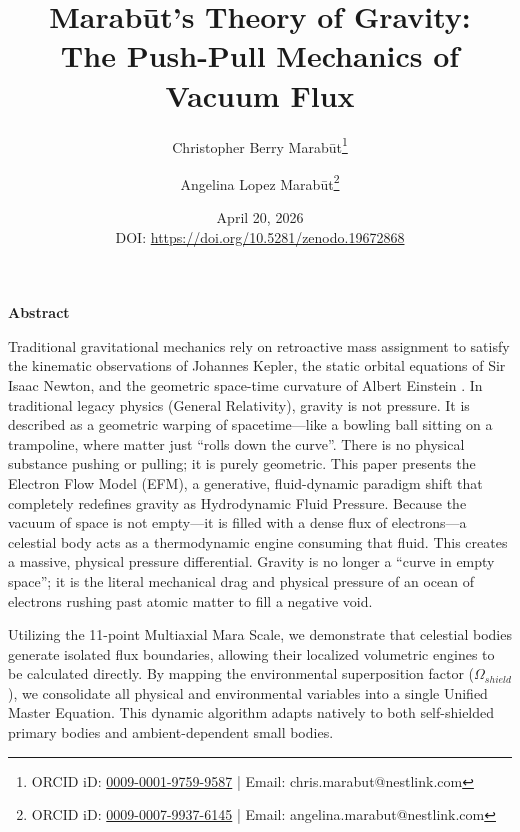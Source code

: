\documentclass[11pt, a4paper]{article}
\title{\textbf{Marab\={u}t's Theory of Gravity: \\ The Push-Pull Mechanics of Vacuum Flux}}
\author[1]{Christopher Berry Marab\={u}t\thanks{ORCID iD: \href{https://orcid.org/0009-0001-9759-9587}{0009-0001-9759-9587} | Email: chris.marabut@nestlink.com}}
\author[1]{Angelina Lopez Marab\={u}t\thanks{ORCID iD: \href{https://orcid.org/0009-0007-9937-6145}{0009-0007-9937-6145} | Email: angelina.marabut@nestlink.com}}
\affil[1]{Independent Researchers}
\date{April 20, 2026 \\ \small{DOI: \url{https://doi.org/10.5281/zenodo.19672868}}}
\begin{document}

\maketitle

\begingroup
  \small
  \begin{center}
    \textbf{Abstract}
  \end{center}
  \vspace{-0.5em}

  Traditional gravitational mechanics rely on retroactive mass assignment to satisfy the kinematic observations of Johannes Kepler, the static orbital equations of Sir Isaac Newton, and the geometric space-time curvature of Albert Einstein \cite{kepler1609, newton1687, einstein1915}. In traditional legacy physics (General Relativity), gravity is not pressure. It is described as a geometric warping of spacetime---like a bowling ball sitting on a trampoline, where matter just ``rolls down the curve''. There is no physical substance pushing or pulling; it is purely geometric. This paper presents the Electron Flow Model (EFM), a generative, fluid-dynamic paradigm shift that completely redefines gravity as Hydrodynamic Fluid Pressure. Because the vacuum of space is not empty---it is filled with a dense flux of electrons---a celestial body acts as a thermodynamic engine consuming that fluid. This creates a massive, physical pressure differential. Gravity is no longer a ``curve in empty space''; it is the literal mechanical drag and physical pressure of an ocean of electrons rushing past atomic matter to fill a negative void.

  Utilizing the 11-point Multiaxial Mara Scale, we demonstrate that celestial bodies generate isolated flux boundaries, allowing their localized volumetric engines to be calculated directly. By mapping the environmental superposition factor ($\Omega_{shield}$), we consolidate all physical and environmental variables into a single Unified Master Equation. This dynamic algorithm adapts natively to both self-shielded primary bodies and ambient-dependent small bodies. 
  
\end{document}
